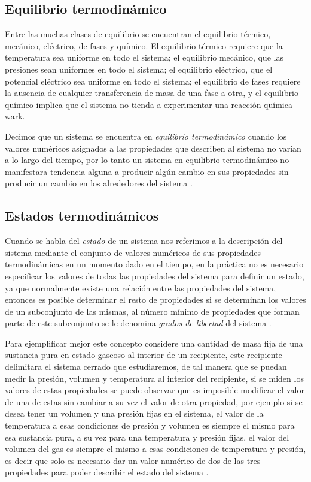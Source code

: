 \documentclass[../master.tex]{subfiles}
\begin{document}
\subsection{Equilibrio termodinámico}


Entre las muchas clases de equilibrio se encuentran el equilibrio térmico, mecánico, eléctrico, de fases y químico. El equilibrio térmico requiere que la temperatura sea uniforme en todo el sistema; el equilibrio mecánico, que las presiones sean uniformes en todo el sistema; el equilibrio eléctrico, que el potencial eléctrico sea uniforme en todo el sistema; el equilibrio de fases requiere la ausencia de cualquier transferencia de masa de una fase a otra, y el equilibrio químico implica que el sistema no tienda a experimentar una reacción química \parencite{clavell}{wark}. 

Decimos que un sistema se encuentra en \emph{equilibrio termodinámico} cuando los valores numéricos asignados a las propiedades que describen al sistema no varían a lo largo del tiempo, por lo tanto un sistema en equilibrio termodinámico no manifestara tendencia alguna a producir algún cambio en sus propiedades sin producir un cambio en los alrededores del sistema \parencites{colin}{clavell}{wark}.

\subsection{Estados termodinámicos}

Cuando se habla del \emph{estado} de un sistema nos referimos a la descripción del sistema mediante el conjunto de valores numéricos de sus propiedades termodinámicas en un momento dado en el tiempo, en la práctica no es necesario especificar los valores de todas las propiedades del sistema para definir un estado, ya que normalmente existe una relación entre las propiedades del sistema, entonces es posible determinar el resto de propiedades si se determinan los valores de un subconjunto de las mismas, al número mínimo de propiedades que forman parte de este subconjunto se le denomina \emph{grados de libertad} del sistema \parencites{moranshapiro}{faires}{colin}.

Para ejemplificar mejor este concepto considere una cantidad de masa fija de una sustancia pura en estado gaseoso al interior de un recipiente, este recipiente delimitara el sistema cerrado que estudiaremos, de tal manera que se puedan medir la presión, volumen y temperatura al interior del recipiente, si se miden los valores de estas propiedades se puede observar que es imposible modificar el valor de una de estas sin cambiar a su vez el valor de otra propiedad, por ejemplo si se desea tener un volumen y una presión fijas en el sistema, el valor de la temperatura a esas condiciones de presión y volumen es siempre el mismo para esa sustancia pura, a su vez para una temperatura y presión fijas, el valor del volumen del gas es siempre el mismo a esas condiciones de temperatura y presión, es decir que solo es necesario dar un valor numérico de dos de las tres propiedades para poder describir el estado del sistema \parencite{clavell}.
\end{document}
